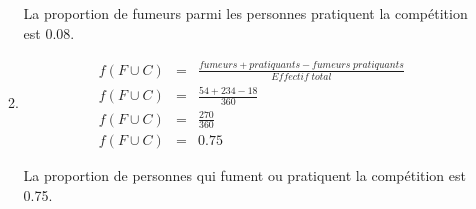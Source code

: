 \documentclass[12pt,a4paper]{article}
\begin{document}
\begin{enumerate}[label=\arabic*)]
\begin{enumerate}[label=\alph*)]
		La proportion de fumeurs parmi les personnes pratiquent la compétition est \num{0.08}.
		
		\item \begin{eqnarray*}
			f(F \cup C) &=& \frac{fumeurs + pratiquants - fumeurs\; pratiquants}{Effectif\; total} \\
			f(F \cup C) &=& \frac{54 + 234 - 18}{360} \\
			f(F \cup C) &=& \frac{270}{360} \\
			f(F \cup C) &=& \num{0.75}
		\end{eqnarray*}
		
		La proportion de personnes qui fument ou pratiquent la compétition est \num{0.75}.
	\end{enumerate}

\end{enumerate}
\end{document}
